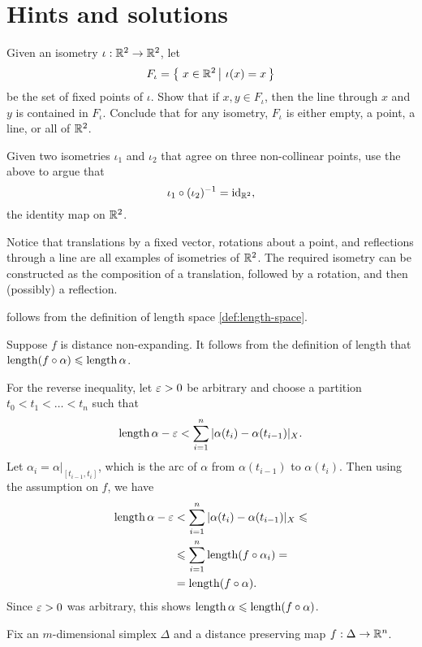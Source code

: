 \chapter*{Hints and solutions}

Given an isometry $\iota: \mathbb{R}^2 \to \mathbb{R}^2$, let
$$F_{\iota} = \set{x \in \RR^2}{\iota(x) = x}$$ be the set of fixed points of $\iota$.  Show that if $x, y \in F_{\iota}$, then the line through $x$ and $y$ is contained in $F_{\iota}$.  Conclude that for any isometry, $F_{\iota}$ is either empty, a point, a line, or all of $\mathbb{R}^2$.

Given two isometries $\iota_1$ and $\iota_2$ that agree on three non-collinear points, use the above to argue that
$$\iota_1 \circ (\iota_2)^{-1} = \operatorname{id}_{\mathbb{R}^2},$$ the identity map on $\mathbb{R}^2$.


Notice that translations by a fixed vector, rotations about a point, and reflections through a line are all examples of isometries of $\mathbb{R}^2$.  The required isometry can be constructed as the composition of a translation, followed by a rotation, and then (possibly) a reflection.

 follows from the definition of length space \ref{def:length-space}.

\parbf{(\ref{LP=>short:b})}
Suppose $f$ is distance non-expanding.  It follows from the definition of length that $\operatorname{length} (f\circ \alpha) \leqslant \operatorname{length} \alpha$.

For the reverse inequality, let $\varepsilon > 0$ be arbitrary and choose a partition $t_0 < t_1 < \dots < t_n$ such that
$$\operatorname{length} \alpha - \varepsilon < \sum_{i=1}^n |\alpha(t_i) - \alpha(t_{i-1})|_X.$$
Let $\alpha_i = \alpha|_{[t_{i-1}, t_i]}$, which is the arc of $\alpha$ from $\alpha(t_{i-1})$ to $\alpha(t_i)$.  Then using the assumption on $f$, we have
\begin{align*}
\operatorname{length} \alpha - \varepsilon &< \sum_{i=1}^n |\alpha(t_i) - \alpha(t_{i-1})|_X \leqslant 
\\
&\leqslant \sum_{i=1}^n \operatorname{length}(f \circ \alpha_i) =
\\
&=\operatorname{length}(f\circ \alpha).
\end{align*}
  Since $\varepsilon >0$ was arbitrary, this shows $\operatorname{length} \alpha \leqslant \operatorname{length} (f \circ \alpha)$.

Fix an $m$-dimensional simplex $\Delta$ and a distance preserving map $f: \Delta \to \mathbb{R}^n$.


